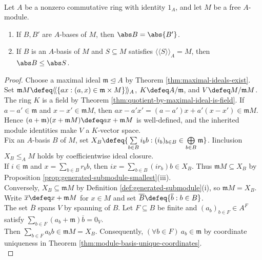 \begin{theorem} \label{thm:free-module-rank-well-defined-commutative} \\
Let $A$ be a nonzero commutative ring with identity $1_A$, and let $M$ be a free $A$-module.
\begin{enumerate}[label=(\roman*)]
\setlength{\itemsep}{0pt}
\item If $B,B'$ are $A$-bases of $M$, then $\abs B=\abs{B'}$.
\item If $B$ is an $A$-basis of $M$ and $S\subseteq M$ satisfies $\langle\!\langle S\rangle\!\rangle_A=M$, then $\abs B\leq\abs S$.
\end{enumerate}
\begin{proof}
Choose a maximal ideal $\mathfrak{m}\trianglelefteq A$ by Theorem \ref{thm:maximal-ideals-exist}. Set $\mathfrak{m}M\defeq\langle\!\langle\{ax:(a,x)\in\mathfrak{m}\times M\}\rangle\!\rangle_A$, $K\defeq A/\mathfrak{m}$, and $V\defeq M/\mathfrak{m}M$.\\
The ring $K$ is a field by Theorem \ref{thm:quotient-by-maximal-ideal-is-field}. If $a-a'\in\mathfrak{m}$ and $x-x'\in\mathfrak{m}M$, then $ax-a'x'=(a-a')x+a'(x-x')\in\mathfrak{m}M$.\\
Hence $(a+\mathfrak{m})(x+\mathfrak{m}M)\defeq ax+\mathfrak{m}M$ is well-defined, and the inherited module identities make $V$ a $K$-vector space.\\
Fix an $A$-basis $B$ of $M$, set $X_B\defeq\{\sum\limits_{b\in B}i_bb:(i_b)_{b\in B}\in\bigoplus\limits_{b\in B}\mathfrak{m}\}$. Iinclusion $X_B\leq_A M$ holds by coefficientwise ideal closure.\\
If $i\in\mathfrak{m}$ and $x=\sum\limits_{b\in B}r_bb$, then $ix=\sum\limits_{b\in B}(ir_b)b\in X_B$. Thus $\mathfrak{m}M\subseteq X_B$ by Proposition \ref{prop:generated-submodule-smallest}(iii).\\
Conversely, $X_B\subseteq\mathfrak{m}M$ by Definition \ref{def:generated-submodule}(i), so $\mathfrak{m}M=X_B$. Write $\overline{x}\defeq x+\mathfrak{m}M$ for $x\in M$ and set $\overline B\defeq\{\overline b:b\in B\}$.\\
The set $\overline B$ spans $V$ by spanning of $B$. Let $F\subseteq B$ be finite and $(a_b)_{b\in F}\in A^F$ satisfy $\sum\limits_{b\in F}(a_b+\mathfrak{m})\overline b=0_V$.\\
Then $\sum\limits_{b\in F}a_bb\in\mathfrak{m}M=X_B$. Consequently, $(\forall b\in F)\ a_b\in\mathfrak{m}$ by coordinate uniqueness in Theorem \ref{thm:module-basis-unique-coordinates}.\\

\end{proof}
\end{theorem}
